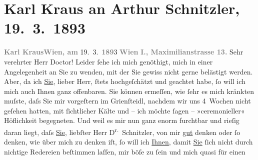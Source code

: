 

               \section[Karl Kraus an Arthur Schnitzler, 19. 3. 1893]{ Karl Kraus an Arthur Schnitzler, 19. 3. 1893}\nopagebreak{}\rehead{ }\begin{ledgroupsized}[t]{13cm}\normalsize\beginnumbering{} \toendnotes[C]{\smallbreak\pagebreak[2]} 
\toendnotes[C]{\smallbreak}\pstart
           \noindent{}{\pb}\textcolor{gray}{\textbf{Karl Kraus}}\hfill \textcolor{gray}{\textbf{Wien, am}}{ }19. 3. \textcolor{gray}{\textbf{189}}3\pend
           \pstart
           \textcolor{gray}{\textbf{Wien}}\pend
           \pstart
           \textcolor{gray}{\textbf{I., Maximilianstrasse 13.}}\pend
           \pstart{}Sehr verehrter Herr Doctor!\pend\pstart
           Leider ſehe ich mich genöthigt, mich in einer Angelegenheit an Sie zu wenden, mit
                    der Sie gewiss nicht gerne belästigt werden. Aber, da ich \uline{Sie}, lieber Herr, ſtets hochgeſchätzt und geachtet habe, ſo will
                    ich \introOben{}mich\introOben{} auch Ihnen  ganz
                    offenbaren. Sie können ermeſſen, wie ſehr es mich kränkten muſste, daſs Sie mir
                    vorgeſtern im Grienſteidl, nachdem wir uns
                    4 Wochen nicht geſehen hatten, mit ſichtlicher Kälte und – ich möchte ſagen –
                    »ceremonieller« Höflichkeit begegneten.\pend
           \pstart
           Und weil es mir nun ganz enorm furchtbar und rieſig daran liegt, daſs \uline{Sie}, liebſter Herr D\textsuperscript{r.} Schnitzler, von mir \uline{gut} denken oder
                    ſo denken, wie über mich zu denken iſt, ſo will ich \uline{Ihnen}, damit \uline{Sie}{ }ſich \introOben{}nicht\introOben{} durch
                    nichtige Redereien beſtimmen laſſen, mir böſe zu ſein und mich quasi für einen

\end{ledgroupsized}

